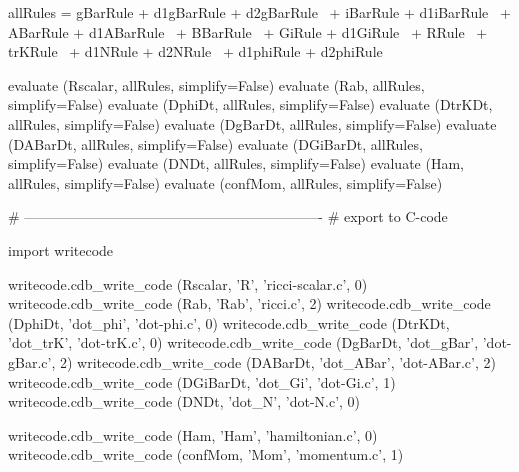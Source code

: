 \documentclass[12pt]{cdblatex}
\begin{document}
\begin{cadabra}
   allRules =  gBarRule + d1gBarRule + d2gBarRule \
             + iBarRule + d1iBarRule \
             + ABarRule + d1ABarRule \
             + BBarRule \
             + GiRule + d1GiRule \
             + RRule \
             + trKRule \
             + d1NRule + d2NRule \
             + d1phiRule + d2phiRule

   evaluate (Rscalar,  allRules, simplify=False)
   evaluate (Rab,      allRules, simplify=False)
   evaluate (DphiDt,   allRules, simplify=False)
   evaluate (DtrKDt,   allRules, simplify=False)
   evaluate (DgBarDt,  allRules, simplify=False)
   evaluate (DABarDt,  allRules, simplify=False)
   evaluate (DGiBarDt, allRules, simplify=False)
   evaluate (DNDt,     allRules, simplify=False)
   evaluate (Ham,      allRules, simplify=False)
   evaluate (confMom,  allRules, simplify=False)

   # ----------------------------------------------------------------
   # export to C-code

   import writecode

   writecode.cdb_write_code (Rscalar,  'R',         'ricci-scalar.c', 0)
   writecode.cdb_write_code (Rab,      'Rab',       'ricci.c',        2)
   writecode.cdb_write_code (DphiDt,   'dot_phi',   'dot-phi.c',      0)
   writecode.cdb_write_code (DtrKDt,   'dot_trK',   'dot-trK.c',      0)
   writecode.cdb_write_code (DgBarDt,  'dot_gBar',  'dot-gBar.c',     2)
   writecode.cdb_write_code (DABarDt,  'dot_ABar',  'dot-ABar.c',     2)
   writecode.cdb_write_code (DGiBarDt, 'dot_Gi',    'dot-Gi.c',       1)
   writecode.cdb_write_code (DNDt,     'dot_N',     'dot-N.c',        0)

   writecode.cdb_write_code (Ham,      'Ham',       'hamiltonian.c',  0)
   writecode.cdb_write_code (confMom,  'Mom',       'momentum.c',     1)

\end{cadabra}
\end{document}
